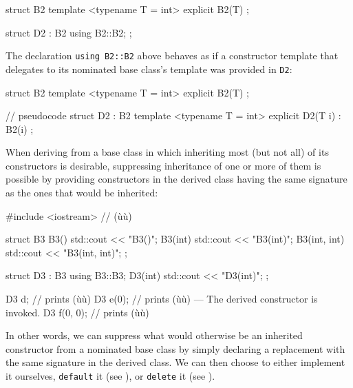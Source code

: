 \begin{emcppslisting}
struct B2
{
    template <typename T = int>
    explicit B2(T) { }
};

struct D2 : B2 { using B2::B2; };
\end{emcppslisting}

\noindent The declaration \lstinline!using!~\lstinline!B2::B2! above behaves as if a
constructor template that delegates to its nominated base class's
template was provided in \lstinline!D2!:

\begin{emcppshiddenlisting}[emcppsbatch=e2]
struct B2
{
    template <typename T = int>
    explicit B2(T) { }
};
\end{emcppshiddenlisting}
\begin{emcppslisting}[emcppsbatch=e2]
// pseudocode
struct D2 : B2
{
    template <typename T = int>
    explicit D2(T i) : B2(i) { }
};
\end{emcppslisting}

\noindent When deriving from a base class in which inheriting most
(but not all) of its constructors is desirable, suppressing
inheritance of one or more of them is possible by providing constructors in the
derived class having the same signature as the ones that would be
inherited:

\begin{emcppshiddenlisting}[emcppsbatch=e3]
#include <iostream>  // (ù{}ù)
\end{emcppshiddenlisting}
\begin{emcppslisting}[emcppsbatch=e3]
struct B3
{
    B3()         { std::cout << "B3()\n"; }
    B3(int)      { std::cout << "B3(int)\n"; }
    B3(int, int) { std::cout << "B3(int, int)\n"; }
};

struct D3 : B3
{
    using B3::B3;
    D3(int) { std::cout << "D3(int)\n"; }
};

D3 d;        // prints (ù{}ù)
D3 e(0);     // prints (ù{}ù) --- The derived constructor is invoked.
D3 f(0, 0);  // prints (ù{}ù)
\end{emcppslisting}

\noindent In other words, we can suppress what would otherwise be an inherited
constructor from a nominated base class by simply declaring a
replacement with the same signature in the derived class. We can then
choose to either implement it ourselves, \lstinline!default! it (see ),
or \lstinline!delete! it (see ).

